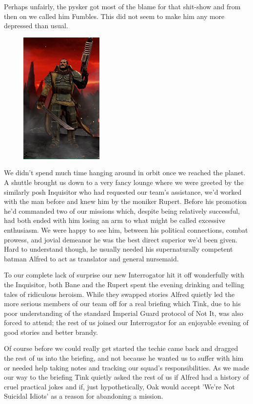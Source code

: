 Perhaps unfairly, the pysker got most of the blame for that shit-show and from then on we called him Fumbles. 
This did not seem to make him any more depressed than usual.

\begin{figure}
	\begin{center}
		\includegraphics[width=\figwidth]{pics/9/10.png}
	\end{center}
\end{figure}
We didn't spend much time hanging around in orbit once we reached the planet. 
A shuttle brought us down to a very fancy lounge where we were greeted by the similarly posh Inquisitor who had requested our team's assistance, we'd worked with the man before and knew him by the moniker Rupert. 
Before his promotion he'd commanded two of our missions which, despite being relatively successful, had both ended with him losing an arm to what might be called excessive enthusiasm. 
We were happy to see him, between his political connections, combat prowess, and jovial demeanor he was the best direct superior we'd been given. 
Hard to understand though, he usually needed his supernaturally competent batman Alfred to act as translator and general nursemaid.

To our complete lack of surprise our new Interrogator hit it off wonderfully with the Inquisitor, both Bane and the Rupert spent the evening drinking and telling tales of ridiculous heroism. 
While they swapped stories Alfred quietly led the more serious members of our team off for a real briefing which Tink, due to his poor understanding of the standard Imperial Guard protocol of Not It, was also forced to attend; 
the rest of us joined our Interrogator for an enjoyable evening of good stories and better brandy. 


Of course before we could really get started the techie came back and dragged the rest of us into the briefing, and not because he wanted us to suffer with him or needed help taking notes and tracking our squad's responsibilities. 
As we made our way to the briefing Tink quietly asked the rest of us if Alfred had a history of cruel practical jokes and if, just hypothetically, Oak would accept 'We're Not Suicidal Idiots' as a reason for abandoning a mission.

